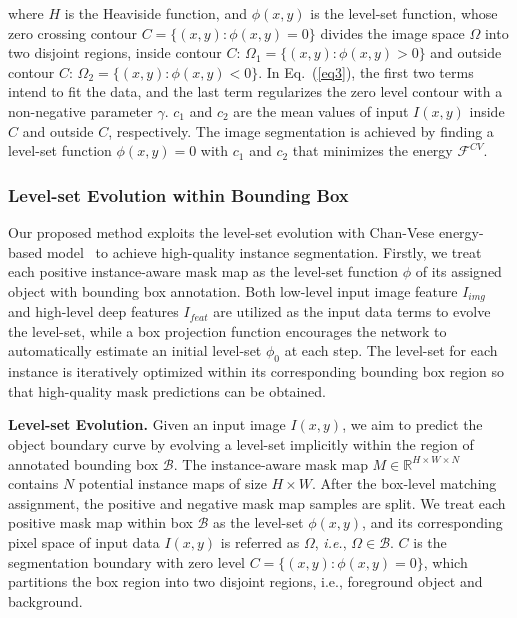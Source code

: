 \documentclass[12pt,onecolumn,letterpaper]{article}
\begin{document}
\noindent
where $H$ is the Heaviside function, and $\phi(x,y)$ is the level-set function, whose zero crossing contour $C = \{ (x,y):\phi (x,y) = 0\}$ divides the image space $\Omega$ into two disjoint regions, 
inside contour $C$: ${\Omega _1} = \{ (x,y):\phi (x,y) > 0\}$ and outside contour $C$: ${\Omega _2} = \{ (x,y):\phi (x,y) < 0\}$. 
In Eq.~(\ref{eq3}), the first two terms intend to fit the data, and the last term regularizes the zero level contour with a non-negative parameter $\gamma$. $c_1$ and $c_2$ are the mean values of input $I(x,y)$ inside $C$ and outside $C$, respectively. The image segmentation is achieved by finding a level-set function $\phi(x,y)= 0$ with ${c_1}$ and ${c_2}$ that minimizes the energy $\mathcal{F}^{CV}$.

\subsubsection{Level-set Evolution within Bounding Box}
Our proposed method exploits the level-set evolution with Chan-Vese energy-based model~\cite{tip2001_active_contour} to achieve high-quality instance segmentation.
Firstly, we treat each positive instance-aware mask map as the level-set function $\phi$ of its assigned object with bounding box annotation. Both low-level input image feature $I_{img}$ and high-level deep features $I_{feat}$ are utilized as the input data terms to evolve the level-set, while a box projection function encourages the network to automatically estimate an initial level-set $\phi_0$ at each step. 
The level-set for each instance is iteratively optimized within its corresponding bounding box region so that high-quality mask predictions can be obtained.


\textbf{Level-set Evolution.}  Given an input image $I(x,y)$, we aim to predict the object boundary curve by evolving a level-set implicitly within the region of annotated bounding box $\mathcal{B}$.
The instance-aware mask map $M \in {\mathbb{R}^{H \times W \times N}}$  contains $N$ potential instance maps of size $H \times W$.   
After the box-level matching  assignment, the positive and negative mask map samples are split. 
We treat each positive mask map within box $\mathcal{B}$ as the level-set $\phi(x,y)$, and its corresponding pixel space of input data $I(x,y)$ is referred as $\Omega$, \textit{i.e.}, $\Omega  \in \mathcal{B}$. $C$ is the segmentation boundary with zero level $C = \{ (x,y):\phi (x,y) = 0\}$, which partitions the box region into two disjoint regions, i.e., foreground object and background. 
\end{document}
